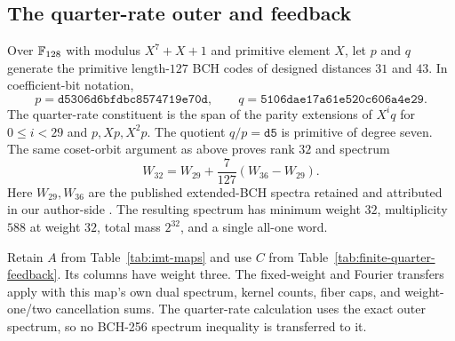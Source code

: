 \subsection{The quarter-rate outer and feedback}
\label{app:finite-quarter-definition}

Over $\mathbb F_{128}$ with modulus $X^7+X+1$ and primitive element $X$, let
$p$ and $q$ generate the primitive length-$127$ BCH codes of designed
distances $31$ and $43$. In coefficient-bit notation,
\[
 p=\texttt{d5306d6bfdbc8574719e70d},\qquad
 q=\texttt{5106dae17a61e520c606a4e29}.
\]
The quarter-rate constituent is the span of the parity extensions of
$X^iq$ for $0\le i<29$ and $p,Xp,X^2p$.
The quotient $q/p=\texttt{d5}$ is primitive of degree seven. The same
coset-orbit argument as above proves rank $32$ and spectrum
\[
 W_{32}=W_{29}+\frac7{127}(W_{36}-W_{29}).
\]
Here $W_{29},W_{36}$ are the published extended-BCH spectra retained and
attributed in our author-side
.
The resulting spectrum has minimum weight $32$, multiplicity $588$ at
weight $32$, total mass $2^{32}$, and a single all-one word.

Retain $A$ from Table~\ref{tab:imt-maps} and use $C$ from
Table~\ref{tab:finite-quarter-feedback}. Its columns have weight three.
The fixed-weight and Fourier transfers apply with this map's own dual
spectrum, kernel counts, fiber caps, and weight-one/two cancellation sums.
The quarter-rate calculation uses the exact outer spectrum, so no BCH-256
spectrum inequality is transferred to it.

